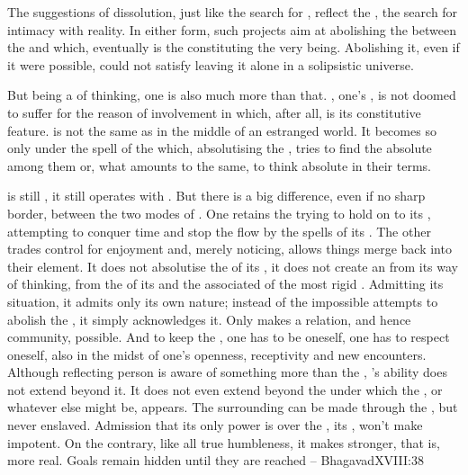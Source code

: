 \pa
The suggestions of dissolution, just like the search for ,
reflect the , the search for intimacy with reality.  In either form,
such  projects aim at abolishing the  between the
 and  which, eventually is the 
constituting the very  being. Abolishing it, even if it were
possible, could not satisfy  leaving it alone in a solipsistic
universe. 

But being a  of  thinking, one is also much more than
that.  , one's , is not doomed to suffer for the
reason of involvement in  which, after all, is its constitutive
feature.  is not the same as  in the middle
of an estranged world. It becomes so only under the spell of the
 which, absolutising the ,
tries to find the absolute among them or, what amounts to the same, to think
absolute in their terms.

 is still , it still operates with
 . But there is a big difference, even if no sharp
border, between the two modes of . One retains the 
trying to hold on to its , attempting to conquer time and stop the
flow by the spells of its . The other trades control
for enjoyment and, merely noticing, allows things merge back into their element.
It does not absolutise the  of its , it does not create
an  from its way of thinking, from the  of its
 and the associated  of the most rigid
.  Admitting its situation, it admits only its own nature;
instead of the impossible attempts to abolish the , it simply
acknowledges it. Only  makes a relation, and hence community,
possible. And to keep the , one has to be oneself, one has to
respect oneself, also in the midst of one's openness, receptivity and new
encounters.  Although reflecting person is aware of something more than the
 , 's ability does not extend beyond it. It
does not even extend beyond the  under which the , or
whatever else might be, appears.  The surrounding  can be made
 through the , but never enslaved.  Admission that its
only power is over the , its , won't make
 impotent.
On the contrary, like all true humbleness, it makes stronger, that is, more
real. Goals remain hidden until they are reached -- \citet{What seems at
  first a cup of sorrow is found in the end immortal wine.}{Bhagavad}{XVIII:38}

